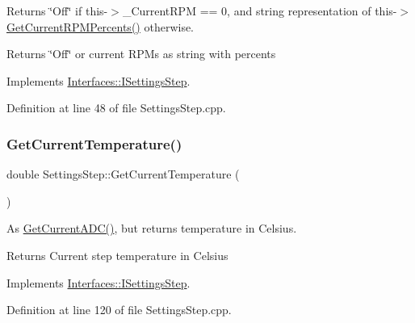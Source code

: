 Returns \char`\"{}\+Off\char`\"{} if this-\/$>$\+\_\+\+Current\+R\+PM == 0, and string representation of this-\/$>$\hyperlink{class_settings_step_a35bea9115637a0c848e8f827f2353c11}{Get\+Current\+R\+P\+M\+Percents()} otherwise. 

\begin{DoxyReturn}{Returns}
\char`\"{}\+Off\char`\"{} or current R\+P\+Ms as string with percents 
\end{DoxyReturn}


Implements \hyperlink{class_interfaces_1_1_i_settings_step_a7575d43b7d178d700e161ec48e2c766f}{Interfaces\+::\+I\+Settings\+Step}.



Definition at line 48 of file Settings\+Step.\+cpp.

\mbox{\label{class_settings_step_a78ec872aa61713e3df36e93f56804afe}} 
\subsubsection{\texorpdfstring{Get\+Current\+Temperature()}{GetCurrentTemperature()}}
{\footnotesize\ttfamily double Settings\+Step\+::\+Get\+Current\+Temperature (\begin{DoxyParamCaption}{ }\end{DoxyParamCaption})\hspace{0.3cm}{\ttfamily [virtual]}}



As \hyperlink{class_settings_step_a443f5643d9b547632c261c5f3a4288f1}{Get\+Current\+A\+D\+C()}, but returns temperature in Celsius. 

\begin{DoxyReturn}{Returns}
Current step temperature in Celsius 
\end{DoxyReturn}


Implements \hyperlink{class_interfaces_1_1_i_settings_step_a62644690b7b63d27e72eca277a32bfdd}{Interfaces\+::\+I\+Settings\+Step}.



Definition at line 120 of file Settings\+Step.\+cpp.

\mbox{\label{class_settings_step_a594ce71fb0626c79c3e4d4f988e484af}} 

